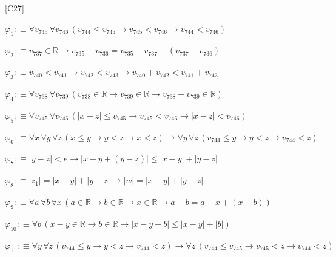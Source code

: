 \begin{fullproof}{[C27]}
\begin{ptree}
\noLine
{}
\end{ptree}
\begin{abbrevlist}
\item $\varphi_{1} :\equiv \forall v_{745}\,\forall v_{746}\,(v_{744} \leq v_{745} \to v_{745} < v_{746} \to v_{744} < v_{746})$
\item $\varphi_{2} :\equiv v_{737} \in \mathbb{R} \to v_{735} - v_{736} = v_{735} - v_{737} + (v_{737} - v_{736})$
\item $\varphi_{3} :\equiv v_{740} < v_{741} \to v_{742} < v_{743} \to v_{740} + v_{742} < v_{741} + v_{743}$
\item $\varphi_{4} :\equiv \forall v_{738}\,\forall v_{739}\,(v_{738} \in \mathbb{R} \to v_{739} \in \mathbb{R} \to v_{738} - v_{739} \in \mathbb{R})$
\item $\varphi_{5} :\equiv \forall v_{745}\,\forall v_{746}\,(\lvert x - z \rvert \leq v_{745} \to v_{745} < v_{746} \to \lvert x - z \rvert < v_{746})$
\item $\varphi_{6} :\equiv \forall x\,\forall y\,\forall z\,(x \leq y \to y < z \to x < z) \to \forall y\,\forall z\,(v_{744} \leq y \to y < z \to v_{744} < z)$
\item $\varphi_{7} :\equiv \lvert y - z \rvert < e \to \lvert x - y + (y - z) \rvert \leq \lvert x - y \rvert + \lvert y - z \rvert$
\item $\varphi_{8} :\equiv \lvert z_{1} \rvert = \lvert x - y \rvert + \lvert y - z \rvert \to \lvert w \rvert = \lvert x - y \rvert + \lvert y - z \rvert$
\item $\varphi_{9} :\equiv \forall a\,\forall b\,\forall x\,(a \in \mathbb{R} \to b \in \mathbb{R} \to x \in \mathbb{R} \to a - b = a - x + (x - b))$
\item $\varphi_{10} :\equiv \forall b\,(x - y \in \mathbb{R} \to b \in \mathbb{R} \to \lvert x - y + b \rvert \leq \lvert x - y \rvert + \lvert b \rvert)$
\item $\varphi_{11} :\equiv \forall y\,\forall z\,(v_{744} \leq y \to y < z \to v_{744} < z) \to \forall z\,(v_{744} \leq v_{745} \to v_{745} < z \to v_{744} < z)$

\end{abbrevlist}
\end{fullproof}
